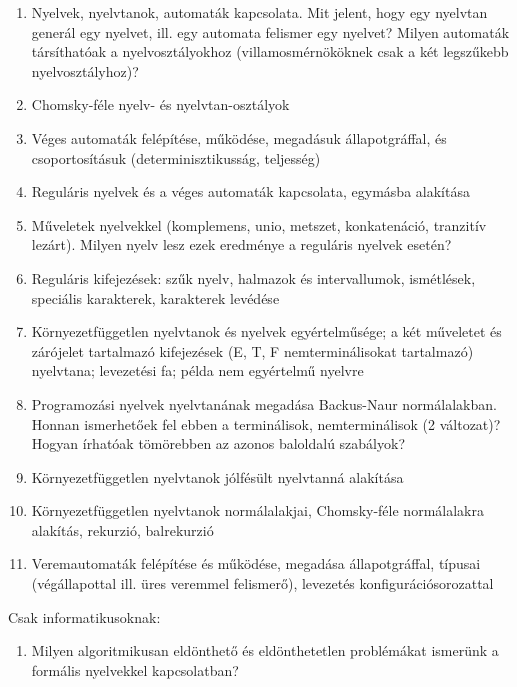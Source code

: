 \documentclass[a4paper]{article}
\begin{document}
\begin{enumerate}
    \Large
    \item Nyelvek, nyelvtanok, automaták kapcsolata. Mit jelent, hogy
        egy nyelvtan generál egy nyelvet, ill. egy automata felismer egy
        nyelvet? Milyen automaták társíthatóak a nyelvosztályokhoz
        (villamosmérnököknek csak a két legszűkebb nyelvosztályhoz)?
    \item Chomsky-féle nyelv- és nyelvtan-osztályok
    \item Véges automaták felépítése, működése, megadásuk
        állapotgráffal, és csoportosításuk (determinisztikusság,
        teljesség)
    \item Reguláris nyelvek és a véges automaták kapcsolata, egymásba
        alakítása
    \item Műveletek nyelvekkel (komplemens, unio, metszet, konkatenáció,
        tranzitív lezárt). Milyen nyelv lesz ezek eredménye a reguláris
        nyelvek esetén?
    \item Reguláris kifejezések: szűk nyelv, halmazok és intervallumok,
	ismétlések, speciális karakterek, karakterek levédése
    \item Környezetfüggetlen nyelvtanok és nyelvek egyértelműsége; a két
        műveletet és zárójelet tartalmazó kifejezések (E, T, F
        nemterminálisokat tartalmazó) nyelvtana; levezetési fa; példa
        nem egyértelmű nyelvre
    \item Programozási nyelvek nyelvtanának megadása Backus-Naur
	normálalakban. Honnan ismerhetőek fel ebben a terminálisok,
	nemterminálisok (2 változat)? Hogyan írhatóak tömörebben az
	azonos baloldalú szabályok?
    \item Környezetfüggetlen nyelvtanok jólfésült nyelvtanná alakítása
    \item Környezetfüggetlen nyelvtanok normálalakjai, Chomsky-féle
        normálalakra alakítás, rekurzió, balrekurzió
    \item Veremautomaták felépítése és működése, megadása
        állapotgráffal, típusai (végállapottal ill. üres veremmel
        felismerő), levezetés konfigurációsorozattal
\end{enumerate}

\hrulefill

Csak informatikusoknak:

\begin{enumerate}
    \Large
    \setcounter{enumi}{10}
    \item Milyen algoritmikusan eldönthető és eldönthetetlen problémákat
        ismerünk a formális nyelvekkel kapcsolatban?
\end{enumerate}
\end{document}
